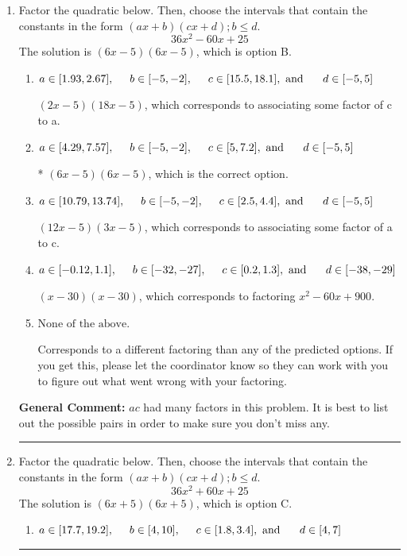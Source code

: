 \documentclass{extbook}[14pt]
\newcommand{\litem}[1]{\item #1

\rule{\textwidth}{0.4pt}}
\begin{document}
\begin{enumerate}\litem{
Factor the quadratic below. Then, choose the intervals that contain the constants in the form $(ax+b)(cx+d); b \leq d.$
\[ 36x^{2} -60 x + 25 \]The solution is \( (6x -5)(6x -5) \), which is option B.\begin{enumerate}[label=\Alph*.]
\item \( a \in [1.93, 2.67], \hspace*{5mm} b \in [-5, -2], \hspace*{5mm} c \in [15.5, 18.1], \text{ and } \hspace*{5mm} d \in [-5, 5] \)

 $(2x -5)(18x -5)$, which corresponds to associating some factor of c to a.
\item \( a \in [4.29, 7.57], \hspace*{5mm} b \in [-5, -2], \hspace*{5mm} c \in [5, 7.2], \text{ and } \hspace*{5mm} d \in [-5, 5] \)

* $(6x -5)(6x -5)$, which is the correct option.
\item \( a \in [10.79, 13.74], \hspace*{5mm} b \in [-5, -2], \hspace*{5mm} c \in [2.5, 4.4], \text{ and } \hspace*{5mm} d \in [-5, 5] \)

 $(12x -5)(3x -5)$, which corresponds to associating some factor of a to c.
\item \( a \in [-0.12, 1.1], \hspace*{5mm} b \in [-32, -27], \hspace*{5mm} c \in [0.2, 1.3], \text{ and } \hspace*{5mm} d \in [-38, -29] \)

 $(x -30)(x -30)$, which corresponds to factoring $x^{2} -60 x + 900$.
\item \( \text{None of the above.} \)

 Corresponds to a different factoring than any of the predicted options. If you get this, please let the coordinator know so they can work with you to figure out what went wrong with your factoring.
\end{enumerate}

\textbf{General Comment:} $ac$ had many factors in this problem. It is best to list out the possible pairs in order to make sure you don't miss any.
}
\litem{
Factor the quadratic below. Then, choose the intervals that contain the constants in the form $(ax+b)(cx+d); b \leq d.$
\[ 36x^{2} +60 x + 25 \]The solution is \( (6x + 5)(6x + 5) \), which is option C.\begin{enumerate}[label=\Alph*.]
\item \( a \in [17.7, 19.2], \hspace*{5mm} b \in [4, 10], \hspace*{5mm} c \in [1.8, 3.4], \text{ and } \hspace*{5mm} d \in [4, 7] \)


\end{enumerate}}
\end{enumerate}
\end{document}
